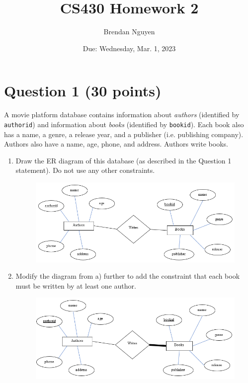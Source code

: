 \documentclass[letterpaper, 11pt]{article}
\title{CS430 Homework 2}
\author{Brendan Nguyen}
\date{Due: Wednesday, Mar. 1, 2023}
\begin{document}
\maketitle

\section*{Question 1 (30 points)}

A movie platform database contains information about \textit{authors} (identified by \texttt{authorid}) and information about \textit{books} (identified by \texttt{bookid}). Each book also has a name, a genre, a release year, and a publisher (i.e. publishing company). Authors also have a name, age, phone, and address. Authors write books.

\begin{enumerate}[label={\alph*})]
    \item Draw the ER diagram of this database (as described in the Question 1 statement). Do not use any other constraints.
    \begin{figure}[H]
        \centering
        \includegraphics[scale=0.7]{hw2-1a.png}
    \end{figure}
    \item Modify the diagram from a) further to add the constraint that each book must be written by at least one author.
    \begin{figure}[H]
        \centering
        \includegraphics[scale=0.7]{hw2-1b.png}

\end{figure}
\end{enumerate}
\end{document}
